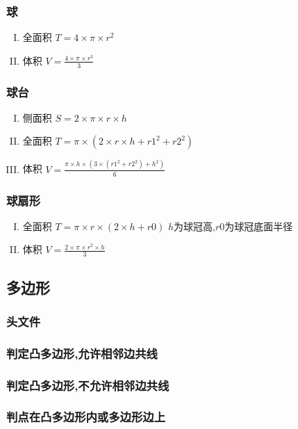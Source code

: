 \subsubsection{球}
\begin{enumerate}[I. ]
	\item 全面积 $T=4\times \pi \times r^{2}$
	\item 体积 $V=\frac{4\times \pi\times r^{3}}{3}$
\end{enumerate}
\subsubsection{球台}
\begin{enumerate}[I. ]
	\item 侧面积 $S=2\times \pi\times r\times h$
	\item 全面积 $T=\pi\times (2\times r\times h+r1^{2}+r2^{2})$
	\item 体积 $V=\frac{\pi\times h\times (3\times (r1^{2}+r2^{2})+h^{2})}{6}$
\end{enumerate}
\subsubsection{球扇形}
\begin{enumerate}[I. ]
	\item 全面积 $T=\pi\times r\times (2\times h+r0)$ $h$为球冠高,$r0$为球冠底面半径
	\item 体积 $V=\frac{2\times \pi\times r^{2}\times h}{3}$
\end{enumerate}

\subsection{多边形}
\subsubsection{头文件}

\subsubsection{判定凸多边形,允许相邻边共线}

\subsubsection{判定凸多边形,不允许相邻边共线}

\subsubsection{判点在凸多边形内或多边形边上}

